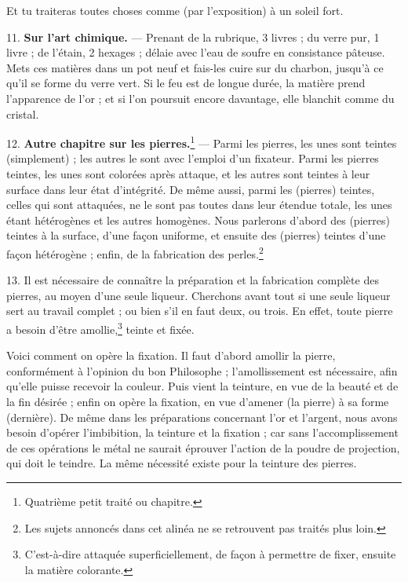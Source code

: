 \documentclass[a4paper, 11pt, oneside, polutonikogreek, french]{article}
\begin{document}
Et tu traiteras toutes choses comme (par l'exposition) à un soleil fort.

11. \textbf{Sur l'art chimique.} --- Prenant de la rubrique, 3 livres ; du verre pur, 1 livre ; de l'étain, 2 hexages ; délaie avec l'eau de soufre en consistance pâteuse. Mets ces matières dans un pot neuf et fais-les cuire sur du charbon, jusqu'à ce qu'il se forme du verre vert. Si le feu est de longue durée, la matière prend l'apparence de l'or ; et si l'on poursuit encore davantage, elle blanchit comme du cristal.

12. \textbf{Autre chapitre sur les pierres.}\footnote{Quatrième petit traité ou chapitre.} --- Parmi les pierres, les unes sont teintes (simplement) ; les autres le sont avec l'emploi d'un fixateur. Parmi les pierres teintes, les unes sont colorées après attaque, et les autres sont teintes à leur surface dans leur état d'intégrité. De même aussi, parmi les (pierres) teintes, celles qui sont attaquées, ne le sont pas toutes dans leur étendue totale, les unes étant hétérogènes et les autres homogènes. Nous parlerons d'abord des (pierres) teintes à la surface, d'une façon uniforme, et ensuite des (pierres) teintes d'une façon hétérogène ; enfin, de la fabrication des perles.\footnote{Les sujets annoncés dans cet alinéa ne se retrouvent pas traités plus loin.}

13. Il est nécessaire de connaître la préparation et la fabrication complète des pierres, au moyen d'une seule liqueur. Cherchons avant tout si une seule liqueur sert au travail complet ; ou bien s'il en faut deux, ou trois. En effet, toute pierre a besoin d'être amollie,\footnote{C'est-à-dire attaquée superficiellement, de façon à permettre de fixer, ensuite la matière colorante.} teinte et fixée.

Voici comment on opère la fixation. Il faut d'abord amollir la pierre, conformément à l'opinion du bon Philosophe ; l'amollissement est nécessaire, afin qu'elle puisse recevoir la couleur. Puis vient la teinture, en vue de la beauté et de la fin désirée ; enfin on opère la fixation, en vue d'amener (la pierre) à sa forme (dernière). De même dans les préparations concernant l'or et l'argent, nous avons besoin d'opérer l'imbibition, la teinture et la fixation ; car sans l'accomplissement de ces opérations le métal ne saurait éprouver l'action de la poudre de projection, qui doit le teindre. La même nécessité existe pour la teinture des pierres.
\end{document}
